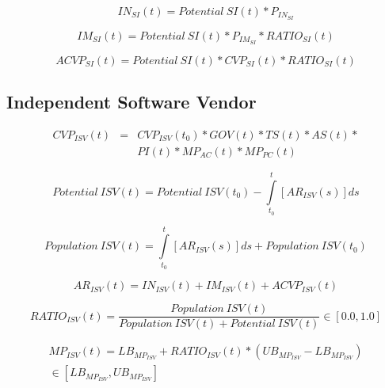 \begin{equation}
		IN_{SI}(t) = \mathit{Potential~SI(t)} * P_{IN_{SI}}
\end{equation}

\begin{equation}
		IM_{SI}(t) = \mathit{Potential~SI(t)} * P_{IM_{SI}} * RATIO_{SI}(t)
\end{equation}

\begin{equation}
		ACVP_{SI}(t) = \mathit{Potential~SI(t)} * CVP_{SI}(t) * RATIO_{SI}(t)
\end{equation}

\subsection{Independent Software Vendor}\label{ch:app04:csf:isv}

\begin{eqnarray}
		CVP_{ISV}(t) & = & CVP_{ISV}(t_0) * GOV(t) * TS(t) * AS(t) * \nonumber \\ & & PI(t) * MP_{AC}(t) * MP_{PC}(t)
\end{eqnarray}

\begin{equation}
	\mathit{Potential~ISV(t)} =\mathit{Potential~ISV(t_0)} - \int\limits_{t_0}^t  [AR_{ISV}(s)]ds
\end{equation}

\begin{equation}
	\mathit{Population~ISV(t)} = \int\limits_{t_0}^t [AR_{ISV}(s)]ds + \mathit{Population~ISV(t_0)}
\end{equation}

\begin{equation}
		AR_{ISV}(t) = IN_{ISV}(t) + IM_{ISV}(t) + ACVP_{ISV}(t)	
\end{equation}

\begin{equation}
		RATIO_{ISV}(t) = \frac{\mathit{Population~ISV(t)}}{\mathit{Population~ISV(t)} + \mathit{Potential~ISV(t)}} \in [0.0,1.0]
\end{equation}

\begin{eqnarray}\label{eq:mp:isv}
	MP_{ISV}(t) = LB_{MP_{ISV}} + RATIO_{ISV}(t) * (UB_{MP_{ISV}} - LB_{MP_{ISV}})  \nonumber \\ \in [LB_{MP_{ISV}},UB_{MP_{ISV}}]
\end{eqnarray}


